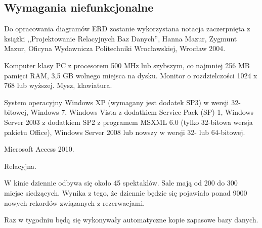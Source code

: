 \subsection*{Wymagania niefunkcjonalne}
\begin{description}[style=nextline]
	\item[Notacja diagramów ERD] Do opracowania diagramów ERD zostanie wykorzystana notacja zaczerpnięta z książki ,,Projektowanie Relacyjnych Baz Danych'', Hanna Mazur, Zygmunt Mazur, Oficyna Wydawnicza Politechniki Wrocławskiej, Wrocław 2004.
	\item[Platforma sprzętowa] Komputer klasy PC z procesorem 500 MHz lub szybszym, co najmniej 256 MB pamięci RAM, 3,5 GB wolnego miejsca na dysku. Monitor o rozdzielczości 1024 x 768 lub wyższej. Mysz, klawiatura.
	\item[Platforma systemowa] System operacyjny Windows XP (wymagany jest dodatek SP3) w wersji 32-bitowej, Windows 7, Windows Vista z dodatkiem Service Pack (SP) 1, Windows Server 2003 z dodatkiem SP2 z programem MSXML 6.0 (tylko 32-bitowa wersja pakietu Office), Windows Server 2008 lub nowszy w wersji 32- lub 64-bitowej.
	\item[Środowisko implementacyjne] Microsoft Access 2010.
	\item[Rodzaj bazy danych] Relacyjna.
	\item[Skalowalność] W kinie dziennie odbywa się około 45 spektaklów. Sale mają od 200 do 300 miejsc siedzących. Wynika z tego, że dziennie będzie się pojawiało ponad 9000 nowych rekordów związanych z rezerwacjami.
	\item[Sposób archiwizacji danych] Raz w tygodniu będą się wykonywały automatyczne kopie zapasowe bazy danych.
\end{description}

	
